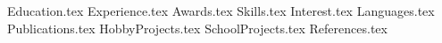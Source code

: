 \documentclass[11pt, a4paper]{awesome-cv}
\newcommand*{\sectiondir}{resume/}
\begin{document}
\makecvheader
\hspace{14.17 cm}


{Education.tex}
\vspace{0.05 cm}
{Experience.tex}
\vspace{0.05 cm}
\newpage
{Awards.tex}
\vspace{-0.1 cm}
{Skills.tex}
\vspace{-0.1 cm}
{Interest.tex}
\vspace{-0.2 cm}
{Languages.tex}
\vspace{0.05 cm}
{Publications.tex}
\vspace{-0.2 cm}
{HobbyProjects.tex}
\vspace{-0.2 cm}
{SchoolProjects.tex}
\vspace{-0.2 cm}
{References.tex}
\end{document}
